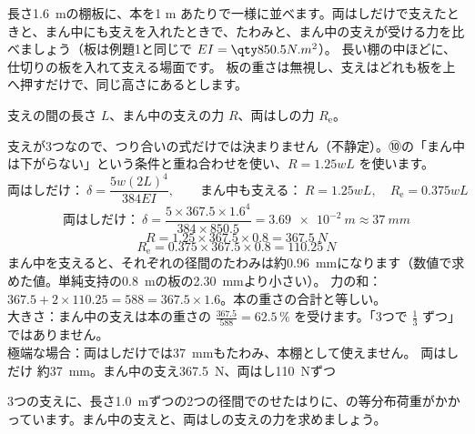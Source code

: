 \begin{phreidai}
\label{ph:力-10:ex12}長さ\qty{1.6}{m}の棚板に、本を1 m あたりで一様に並べます。両はしだけで支えたときと、まん中にも支えを入れたときで、たわみと、まん中の支えが受ける力を比べましょう（板は例題1と同じで $EI=\pxkq{850.5}{N.m^2}$）。
\phbamen
長い棚の中ほどに、仕切りの板を入れて支える場面です。
\phmushi
板の重さは無視し、支えはどれも板を上へ押すだけで、同じ高さにあるとします。
\phzu
\par\vspace{3pt}\noindent\begin{minipage}[c]{0.52\linewidth}
\end{minipage}\hfill
\begin{minipage}[c]{0.44\linewidth}
支えの間の長さ $L$、まん中の支えの力 $R$、両はしの力 $R_{\mathrm e}$。
\end{minipage}
\phriyu
支えが3つなので、つり合いの式だけでは決まりません（不静定）。⑩の「まん中は下がらない」という条件と重ね合わせを使い、$R=1.25wL$ を使います。
\phtateru
\[\text{両はしだけ：}\ \delta=\frac{5w(2L)^4}{384EI},\qquad\text{まん中も支える：}\ R=1.25wL,\quad R_{\mathrm e}=0.375wL\]
\phtoku
\[ \text{両はしだけ：}\ \delta=\frac{5\times367.5\times1.6^4}{384\times850.5}=\qty{3.69e-2}{m}\approx\qty{37}{mm} \]
\[ R=1.25\times367.5\times0.8=\qty{367.5}{N} \]
\[ R_{\mathrm e}=0.375\times367.5\times0.8=\qty{110.25}{N} \]
まん中を支えると、それぞれの径間のたわみは約\qty{0.96}{mm}になります（数値で求めた値。単純支持の\qty{0.8}{m}の板の\qty{2.30}{mm}より小さい）。
\phtashikame
力の和：$367.5+2\times110.25=588=367.5\times1.6$。本の重さの合計と等しい。\\
大きさ：まん中の支えは本の重さの $\tfrac{367.5}{588}=62.5\,\%$ を受けます。「3つで $\tfrac{1}{3}$ ずつ」ではありません。\\
極端な場合：両はしだけでは\qty{37}{mm}もたわみ、本棚として使えません。
\kotae 両はしだけ 約\qty{37}{mm}。まん中の支え\qty{367.5}{N}、両はし\qty{110}{N}ずつ
\end{phreidai}
\begin{jibun}
3つの支えに、長さ\qty{1.0}{m}ずつの2つの径間でのせたはりに、の等分布荷重がかかっています。まん中の支えと、両はしの支えの力を求めましょう。
\end{jibun}

